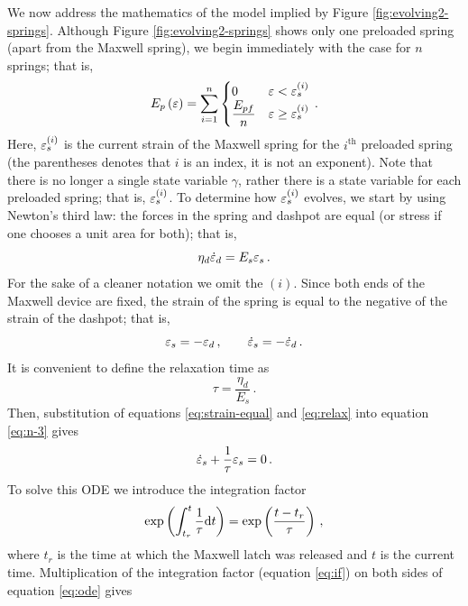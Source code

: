 \documentclass{article}
\begin{document}
We now address the mathematics of the model implied by Figure \ref{fig:evolving2-springs}. Although Figure \ref{fig:evolving2-springs} shows only one preloaded spring (apart from the Maxwell spring), we begin immediately with the case for $n$ springs; that is,
\begin{equation}
	E_p\left(\varepsilon\right) = \sum_{i=1}^{n}\begin{cases}
		0 & \varepsilon < \varepsilon_{s}^{(i)} \\
		\dfrac{E_{pf}}{n} & \varepsilon \geq \varepsilon_{s}^{(i)}
	\end{cases}\,.
	\label{eq:springs-evolve}
\end{equation}
Here, $\varepsilon_{s}^{(i)}$ is the current strain of the Maxwell spring for the $i^{\text{th}}$ preloaded spring (the parentheses denotes that $i$ is an index, it is not an exponent). Note that there is no longer a single state variable $\gamma$, rather there is a state variable for each preloaded spring; that is, $\varepsilon_{s}^{(i)}$. To determine how $\varepsilon_{s}^{(i)}$ evolves, we start by using Newton's third law: the forces in the spring and dashpot are equal (or stress if one chooses a unit area for both); that is,
\begin{equation}
	\eta_d \dot{\varepsilon}_{d} = E_{s}\varepsilon_{s}\,.
	\label{eq:n-3}
\end{equation}
For the sake of a cleaner notation we omit the $(i)$. Since both ends of the Maxwell device are fixed, the strain of the spring is equal to the negative of the strain of the dashpot; that is,
\begin{equation}
	\varepsilon_{s} = - \varepsilon_{d}\,, \qquad \dot{\varepsilon}_{s} = - \dot{\varepsilon}_{d}\,.
	\label{eq:strain-equal}
\end{equation}
It is convenient to define the relaxation time as
\begin{equation}
	\tau = \dfrac{\eta_{d}}{E_{s}}\,.
	\label{eq:relax}
\end{equation}
Then, substitution of equations \eqref{eq:strain-equal} and \eqref{eq:relax} into equation \eqref{eq:n-3} gives
\begin{equation}
	\dot{\varepsilon}_{s} + \dfrac{1}{\tau}\varepsilon_{s} = 0\,.
	\label{eq:ode}
\end{equation}
To solve this ODE we introduce the integration factor
\begin{equation}
	\exp\left(\int_{t_r}^{t}\dfrac{1}{\tau}\text{d} t\right) = \exp\left(\dfrac{t-t_{r}}{\tau}\right)\,,
	\label{eq:if}
\end{equation}
where $t_r$ is the time at which the Maxwell latch was released and $t$ is the current time. Multiplication of the integration factor (equation \eqref{eq:if}) on both sides of equation \eqref{eq:ode} gives
\end{document}
